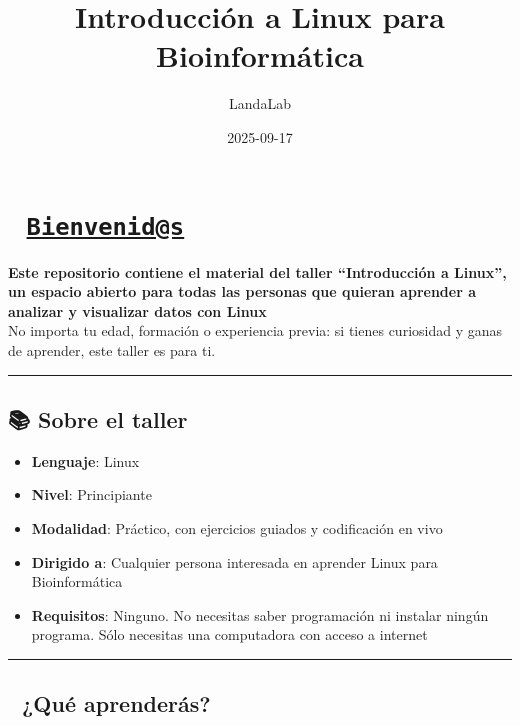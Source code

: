 \documentclass[
]{book}
\title{Introducción a Linux para Bioinformática}
\author{LandaLab}
\date{2025-09-17}
\providecommand{\tightlist}{%
  \setlength{\itemsep}{0pt}\setlength{\parskip}{0pt}}
\begin{document}
\maketitle

{
\setcounter{tocdepth}{1}
\tableofcontents
}
\chapter{\texorpdfstring{🧪 \href{mailto:Bienvenid@s}{\nolinkurl{Bienvenid@s}}}{🧪 Bienvenid@s}}\label{bienvenids}

\textbf{Este repositorio contiene el material del taller ``Introducción a Linux'', un espacio abierto para todas las personas que quieran aprender a analizar y visualizar datos con Linux}\\
No importa tu edad, formación o experiencia previa: si tienes curiosidad y ganas de aprender, este taller es para ti.

\begin{center}\rule{0.5\linewidth}{0.5pt}\end{center}

\section{📚 Sobre el taller}\label{sobre-el-taller}

\begin{itemize}
\tightlist
\item
  \textbf{Lenguaje}: Linux
\item
  \textbf{Nivel}: Principiante\\
\item
  \textbf{Modalidad}: Práctico, con ejercicios guiados y codificación en vivo\\
\item
  \textbf{Dirigido a}: Cualquier persona interesada en aprender Linux para Bioinformática\\
\item
  \textbf{Requisitos}: Ninguno. No necesitas saber programación ni instalar ningún programa. Sólo necesitas una computadora con acceso a internet
\end{itemize}

\begin{center}\rule{0.5\linewidth}{0.5pt}\end{center}

\section{🧰 ¿Qué aprenderás?}\label{quuxe9-aprenderuxe1s}
\end{document}
